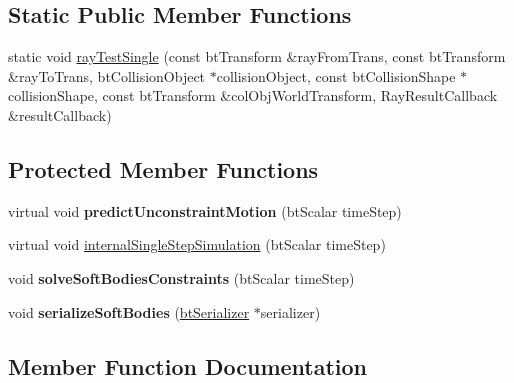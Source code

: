 \subsection*{Static Public Member Functions}
\begin{DoxyCompactItemize}
\item 
static void \hyperlink{classbtSoftRigidDynamicsWorld_a918218d4fe565ce42fd78c9d06d22cb0}{ray\+Test\+Single} (const bt\+Transform \&ray\+From\+Trans, const bt\+Transform \&ray\+To\+Trans, bt\+Collision\+Object $\ast$collision\+Object, const bt\+Collision\+Shape $\ast$collision\+Shape, const bt\+Transform \&col\+Obj\+World\+Transform, Ray\+Result\+Callback \&result\+Callback)
\end{DoxyCompactItemize}
\subsection*{Protected Member Functions}
\begin{DoxyCompactItemize}
\item 
\mbox{\label{classbtSoftRigidDynamicsWorld_aa2fe667a197a86d8bbfdd1149010afea}} 
virtual void {\bfseries predict\+Unconstraint\+Motion} (bt\+Scalar time\+Step)
\item 
virtual void \hyperlink{classbtSoftRigidDynamicsWorld_ace902ab44e0e090b82e2031f154d7015}{internal\+Single\+Step\+Simulation} (bt\+Scalar time\+Step)
\item 
\mbox{\label{classbtSoftRigidDynamicsWorld_af65fd70ac5706da07d6f99286662e4fe}} 
void {\bfseries solve\+Soft\+Bodies\+Constraints} (bt\+Scalar time\+Step)
\item 
\mbox{\label{classbtSoftRigidDynamicsWorld_a289b622acef102e2b8471376993bdd23}} 
void {\bfseries serialize\+Soft\+Bodies} (\hyperlink{classbtSerializer}{bt\+Serializer} $\ast$serializer)
\end{DoxyCompactItemize}


\subsection{Member Function Documentation}
\mbox{\label{classbtSoftRigidDynamicsWorld_ace902ab44e0e090b82e2031f154d7015}} 
